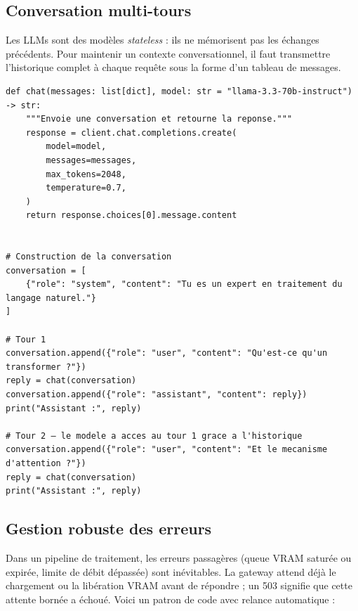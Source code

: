 \documentclass[12pt, a4paper, twoside]{article}
\begin{document}
\subsection{Conversation multi-tours}

Les LLMs sont des modèles \textit{stateless} : ils ne mémorisent pas les échanges précédents.
Pour maintenir un contexte conversationnel, il faut transmettre l'historique complet à chaque
requête sous la forme d'un tableau de messages.

\begin{lstlisting}[style=pythonstyle, caption={Gestion d'une conversation multi-tours}]
def chat(messages: list[dict], model: str = "llama-3.3-70b-instruct") -> str:
    """Envoie une conversation et retourne la reponse."""
    response = client.chat.completions.create(
        model=model,
        messages=messages,
        max_tokens=2048,
        temperature=0.7,
    )
    return response.choices[0].message.content


# Construction de la conversation
conversation = [
    {"role": "system", "content": "Tu es un expert en traitement du langage naturel."}
]

# Tour 1
conversation.append({"role": "user", "content": "Qu'est-ce qu'un transformer ?"})
reply = chat(conversation)
conversation.append({"role": "assistant", "content": reply})
print("Assistant :", reply)

# Tour 2 — le modele a acces au tour 1 grace a l'historique
conversation.append({"role": "user", "content": "Et le mecanisme d'attention ?"})
reply = chat(conversation)
print("Assistant :", reply)
\end{lstlisting}

\subsection{Gestion robuste des erreurs}

Dans un pipeline de traitement, les erreurs passagères (queue VRAM saturée ou expirée,
limite de débit dépassée) sont inévitables. La gateway attend déjà le chargement ou
la libération VRAM avant de répondre ; un 503 signifie que cette attente bornée a
échoué. Voici un patron de code avec relance automatique :
\end{document}
